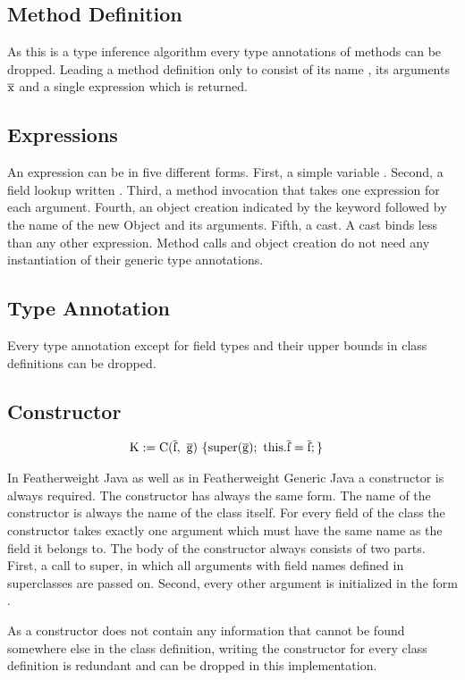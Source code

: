 \subsection{Method Definition}

As this is a type inference algorithm every type annotations of methods can be dropped. Leading a method definition only to consist of its name , its arguments $\overline{\text{x}}$ and a single expression  which is returned.

\subsection{Expressions}

An expression  can be in five different forms. First, a simple variable . Second, a field lookup written . Third, a method invocation that takes one expression for each argument. Fourth, an object creation indicated by the keyword  followed by the name of the new Object and its arguments. Fifth, a cast.
A cast binds less than any other expression. Method calls and object creation do not need any instantiation of their generic type annotations.

\subsection{Type Annotation}

Every type annotation except for field types and their upper bounds in class definitions can be dropped.

\subsection{Constructor}

\begin{align*}
    \text{K} &:= \text{C}(\overline{\text{f}}, \ \overline{\text{g}}) \ \{ \text{super}(\overline{\text{g}}); \ \text{this}.\overline{\text{f}}=\overline{\text{f}}; \}
\end{align*}

In Featherweight Java as well as in Featherweight Generic Java a constructor is always required. The constructor has always the same form.
The name of the constructor is always the name of the class itself. For every field of the class the constructor takes exactly one argument which must have the same name as the field it belongs to.
The body of the constructor always consists of two parts. First, a call to super, in which all arguments with field names defined in superclasses are passed on.
Second, every other argument is initialized in the form .

As a constructor does not contain any information that cannot be found somewhere else in the class definition, writing the constructor for every class definition is redundant and can be dropped in this implementation.
